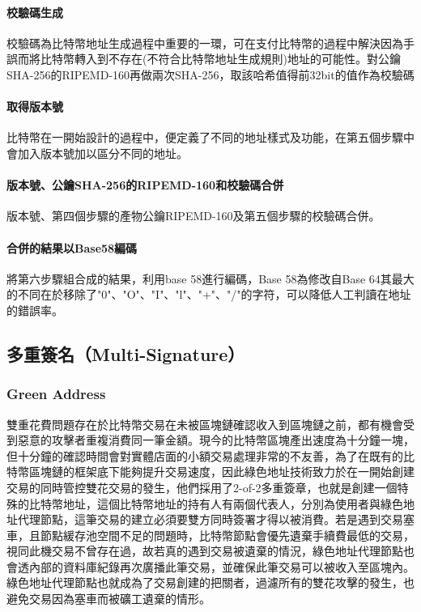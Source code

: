 			\paragraph{校驗碼生成}校驗碼為比特幣地址生成過程中重要的一環，可在支付比特幣的過程中解決因為手誤而將比特幣轉入到不存在(不符合比特幣地址生成規則)地址的可能性。對公鑰SHA-256的RIPEMD-160再做兩次SHA-256，取該哈希值得前32bit的值作為校驗碼
			\paragraph{取得版本號}比特幣在一開始設計的過程中，便定義了不同的地址樣式及功能，在第五個步驟中會加入版本號加以區分不同的地址。
			\paragraph{版本號、公鑰SHA-256的RIPEMD-160和校驗碼合併}版本號、第四個步驟的產物公鑰RIPEMD-160及第五個步驟的校驗碼合併。
			\paragraph{合併的結果以Base58編碼}將第六步驟組合成的結果，利用base 58進行編碼，Base 58為修改自Base 64其最大的不同在於移除了"0"、"O"、"I"、"l"、"+"、"/"的字符，可以降低人工判讀在地址的錯誤率。


		\subsection{多重簽名（Multi-Signature）}
		 	\subsubsection{Green Address}
		 	雙重花費問題存在於比特幣交易在未被區塊鏈確認收入到區塊鏈之前，都有機會受到惡意的攻擊者重複消費同一筆金額。現今的比特幣區塊產出速度為十分鐘一塊，但十分鐘的確認時間會對實體店面的小額交易處理非常的不友善，為了在既有的比特幣區塊鏈的框架底下能夠提升交易速度，因此綠色地址技術致力於在一開始創建交易的同時管控雙花交易的發生，他們採用了2-of-2多重簽章，也就是創建一個特殊的比特幣地址，這個比特幣地址的持有人有兩個代表人，分別為使用者與綠色地址代理節點，這筆交易的建立必須要雙方同時簽署才得以被消費。若是遇到交易塞車，且節點緩存池空間不足的問題時，比特幣節點會優先遺棄手續費最低的交易，視同此機交易不曾存在過，故若真的遇到交易被遺棄的情況，綠色地址代理節點也會透內部的資料庫紀錄再次廣播此筆交易，並確保此筆交易可以被收入至區塊內。綠色地址代理節點也就成為了交易創建的把關者，過濾所有的雙花攻擊的發生，也避免交易因為塞車而被礦工遺棄的情形。

